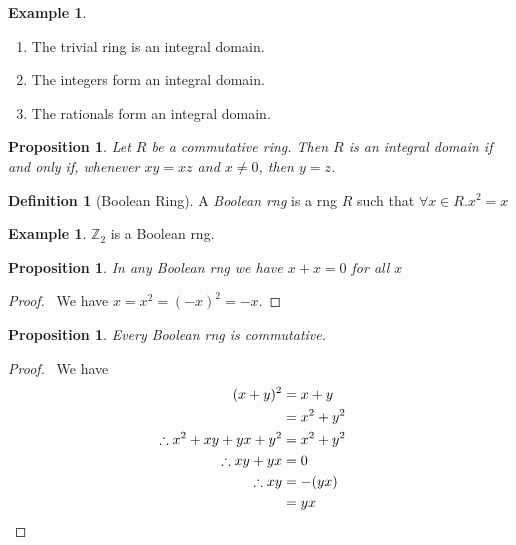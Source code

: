 \documentclass{article}
\let\qed\relax
\newtheorem{proposition}[axiom]{Proposition}
\theoremstyle{definition}
\newtheorem{definition}[axiom]{Definition}
\newtheorem{example}[axiom]{Example}
\begin{document}
    \begin{example}
        \begin{enumerate}
            \item The trivial ring is an integral domain.
            \item The integers form an integral domain.
            \item The rationals form an integral domain.
        \end{enumerate}
    \end{example}

    \begin{proposition}
        \label{proposition:cancellation}
        Let $R$ be a commutative ring. Then $R$ is an integral domain if and only if, whenever $xy = xz$
        and $x \neq 0$, then $y = z$.
    \end{proposition}

    \begin{definition}[Boolean Ring]
        A \emph{Boolean rng} is a rng $R$ such that $\forall x \in R. x^2 = x$
    \end{definition}

    \begin{example}
        $\mathbb{Z}_2$ is a Boolean rng.
    \end{example}

    \begin{proposition}
        In any Boolean rng we have $x + x = 0$ for all $x$
    \end{proposition}

    \begin{proof}
        \pf\ We have $x = x^2 = (-x)^2 = -x$. \qed
    \end{proof}

    \begin{proposition}
        Every Boolean rng is commutative.
    \end{proposition}

    \begin{proof}
        \pf\ We have
        \begin{align*}
            (x+y)^2 & = x+y \\
            & = x^2 + y^2 \\
            \therefore x^2 + xy + yx + y^2 & = x^2 + y^2 \\
            \therefore xy + yx & = 0 \\
            \therefore xy & = -(yx) \\
            & = yx & \qed
        \end{align*}
    \end{proof}
\end{document}
